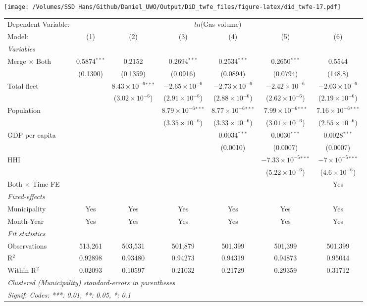 \documentclass[
]{article}
\begin{document}
\texttt{[image: /Volumes/SSD Hans/Github/Daniel\_UWO/Output/DiD\_twfe\_files/figure-latex/did\_twfe-17.pdf]}

\begin{tabular}{lcccccc}
\tabularnewline\midrule\midrule
Dependent Variable:&\multicolumn{6}{c}{$ln$(Gas volume)}\\
Model:&(1) & (2) & (3) & (4) & (5) & (6)\\
\midrule \emph{Variables}&   &   &   &   &   &  \\
Merge $\times $ Both & 0.5874$^{***}$ & 0.2152 & 0.2694$^{***}$ & 0.2534$^{***}$ & 0.2650$^{***}$ & 0.5544\\
  &(0.1300) & (0.1359) & (0.0916) & (0.0894) & (0.0794) & (148.8)\\
Total fleet &    & $8.43\times 10^{-6}$$^{***}$ & $-2.65\times 10^{-6}$ & $-2.73\times 10^{-6}$ & $-2.42\times 10^{-6}$ & $-2.03\times 10^{-6}$\\
  &   & ($3.02\times 10^{-6}$) & ($2.91\times 10^{-6}$) & ($2.88\times 10^{-6}$) & ($2.62\times 10^{-6}$) & ($2.19\times 10^{-6}$)\\
Population &    &    & $8.79\times 10^{-6}$$^{***}$ & $8.77\times 10^{-6}$$^{***}$ & $7.99\times 10^{-6}$$^{***}$ & $7.16\times 10^{-6}$$^{***}$\\
  &   &    & ($3.35\times 10^{-6}$) & ($3.33\times 10^{-6}$) & ($3.01\times 10^{-6}$) & ($2.55\times 10^{-6}$)\\
GDP per capita &    &    &    & 0.0034$^{***}$ & 0.0030$^{***}$ & 0.0028$^{***}$\\
  &   &    &    & (0.0010) & (0.0007) & (0.0007)\\
HHI &    &    &    &    & $-7.33\times 10^{-5}$$^{***}$ & $-7\times 10^{-5}$$^{***}$\\
  &   &    &    &    & ($5.22\times 10^{-6}$) & ($4.6\times 10^{-6}$)\\
Both $\times$ Time FE &  &  &  &  &  & Yes\\
\midrule \emph{Fixed-effects}&   &   &   &   &   &  \\
Municipality & Yes & Yes & Yes & Yes & Yes & Yes\\
Month-Year & Yes & Yes & Yes & Yes & Yes & Yes\\
\midrule \emph{Fit statistics}&  & & & & & \\
Observations & 513,261&503,531&501,879&501,399&501,399&501,399\\
R$^2$ & 0.92898&0.93480&0.94273&0.94319&0.94873&0.95044\\
Within R$^2$ & 0.02093&0.10597&0.21032&0.21729&0.29359&0.31712\\
\midrule\midrule\multicolumn{7}{l}{\emph{Clustered (Municipality) standard-errors in parentheses}}\\
\multicolumn{7}{l}{\emph{Signif. Codes: ***: 0.01, **: 0.05, *: 0.1}}\\
\end{tabular}
\end{document}
